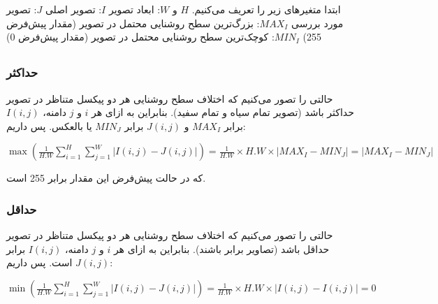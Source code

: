\documentclass{article}
\begin{document}


\newpage


\section{}%
ابتدا متغیرهای زیر را تعریف می‌کنیم.
\newline
$H$ و $W$: ابعاد تصویر
\newline
$I$: تصویر اصلی
\newline
$J$: تصویر مورد بررسی
\newline
$MAX_{I}$: بزرگ‌ترین سطح روشنایی محتمل در تصویر (مقدار پیش‌فرض 255)
\newline
$MIN_{I}$: کوچک‌ترین سطح روشنایی محتمل در تصویر (مقدار پیش‌فرض 0)

\subsection{}
\subsubsection{حداکثر}
حالتی را تصور می‌کنیم که اختلاف سطح روشنایی هر دو پیکسل متناظر در تصویر حداکثر باشد (تصویر تمام سیاه و تمام سفید). بنابراین به ازای هر $i$ و $j$ دامنه، $I(i, j)$ برابر $MAX_{I}$ و $J(i, j)$ برابر $MIN_{J}$ یا بالعکس. پس داریم:
\newline
\begin{latin}
$
\max(\frac{1}{H.W}\sum_{i=1}^{H}\sum_{j=1}^{W}\left| I(i, j) - J(i, j) \right|)=\frac{1}{H.W}\times H.W\times \left| MAX_{I} - MIN_{J} \right|=\left| MAX_{I} - MIN_{J} \right|
$
\end{latin}
که در حالت پیش‌فرض این مقدار برابر 255 است.
\subsubsection{حداقل}
حالتی را تصور می‌کنیم که اختلاف سطح روشنایی هر دو پیکسل متناظر در تصویر حداقل باشد (تصاویر برابر باشند). بنابراین به ازای هر $i$ و $j$ دامنه، $I(i, j)$ برابر $J(i, j)$ است. پس داریم:
\newline
\begin{latin}
$
\min(\frac{1}{H.W}\sum_{i=1}^{H}\sum_{j=1}^{W}\left| I(i, j) - J(i, j) \right|)=\frac{1}{H.W}\times H.W\times \left| I(i, j) - I(i, j) \right|=0
$
\end{latin}
\end{document}
